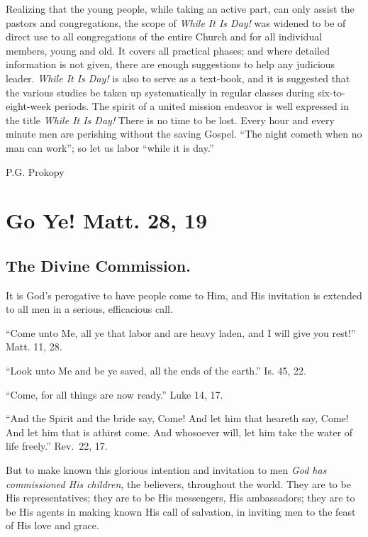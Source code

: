 \documentclass[
]{book}
\begin{document}
Realizing that the young people, while taking an active part, can only assist the pastors and congregations, the scope of \emph{While It Is Day!} was widened to be of direct use to all congregations of the entire Church and for all individual members, young and old. It covers all practical phases; and where detailed information is not given, there are enough suggestions to help any judicious leader. \emph{While It Is Day!} is also to serve as a text-book, and it is suggested that the various studies be taken up systematically in regular classes during six-to-eight-week periods. The spirit of a united mission endeavor is well expressed in the title \emph{While It Is Day!} There is no time to be lost. Every hour and every minute men are perishing without the saving Gospel. ``The night cometh when no man can work''; so let us labor ``while it is day.''

P.G. Prokopy

\hypertarget{go-ye-matt.-28-19}{%
\chapter{Go Ye! Matt. 28, 19}\label{go-ye-matt.-28-19}}

\hypertarget{the-divine-commission.}{%
\section*{The Divine Commission.}\label{the-divine-commission.}}

It is God's perogative to have people come to Him, and His invitation is extended to all men in a serious, efficacious call.

``Come unto Me, all ye that labor and are heavy laden, and I will give you rest!'' Matt. 11, 28.

``Look unto Me and be ye saved, all the ends of the earth.'' Is. 45, 22.

``Come, for all things are now ready.'' Luke 14, 17.

``And the Spirit and the bride say, Come! And let him that heareth say, Come! And let him that is athirst come. And whosoever will, let him take the water of life freely.'' Rev.~22, 17.

But to make known this glorious intention and invitation to men \emph{God has commissioned His children}, the believers, throughout the world. They are to be His representatives; they are to be His messengers, His ambassadors; they are to be His agents in making known His call of salvation, in inviting men to the feast of His love and grace.
\end{document}
